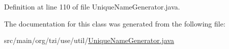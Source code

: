 Definition at line 110 of file Unique\-Name\-Generator.\-java.



The documentation for this class was generated from the following file\-:\begin{DoxyCompactItemize}
\item 
src/main/org/tzi/use/util/\hyperlink{_unique_name_generator_8java}{Unique\-Name\-Generator.\-java}\end{DoxyCompactItemize}
